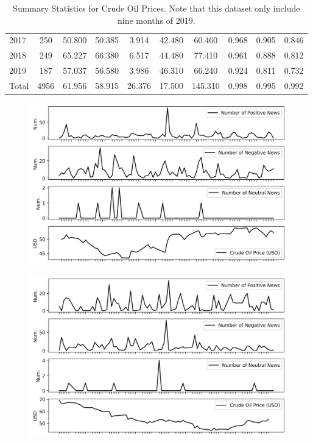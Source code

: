 \documentclass[12pt]{article}
\begin{document}
\begin{table}[H]
\begin{tabular}{l|c c c c c c c c c}
			2017 & 250 & 50.800 & 50.385 & 3.914 & 42.480 & 60.460 & 0.968 & 0.905 & 0.846 \\
			2018 & 249 & 65.227 & 66.380 & 6.517 & 44.480 & 77.410 & 0.961 & 0.888 & 0.812 \\
			2019 & 187 & 57.037 & 56.580 & 3.986 & 46.310 & 66.240 & 0.924 & 0.811 & 0.732 \\
			\midrule
			Total & 4956 & 61.956 & 58.915 & 26.376 & 17.500 & 145.310 & 0.998 & 0.995 & 0.992 \\
			\bottomrule
		\end{tabular}
		\caption{Summary Statistics for Crude Oil Prices. Note that this dataset only include nine months of 2019.}
	\end{table}
	
	\begin{figure}[H]
		\centering
		\small
		\includegraphics[width=\linewidth]{figures/case_studies/20161130_45d.png}
		\caption{}
	\end{figure}
	\begin{figure}[H]
		\centering
		\small
		\includegraphics[width=\linewidth]{figures/case_studies/20181206_45d.png}
		\caption{}
	\end{figure}
\end{document}

